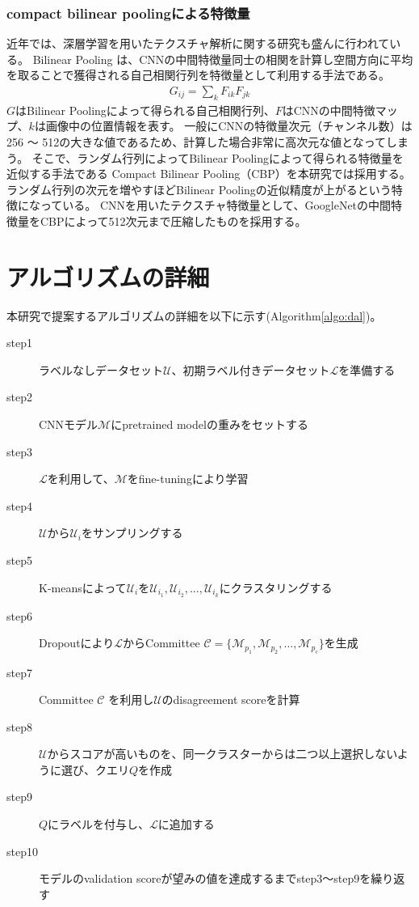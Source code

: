 \subsubsection{compact bilinear poolingによる特徴量}
近年では、深層学習を用いたテクスチャ解析に関する研究も盛んに行われている。
Bilinear Pooling \cite{lin2015bilinear}は、CNNの中間特徴量同士の相関を計算し空間方向に平均を取ることで獲得される自己相関行列を特徴量として利用する手法である。
\begin{eqnarray}
G_{ij} = \sum_k{F_{ik} F_{jk}}
\end{eqnarray}
$G$はBilinear Poolingによって得られる自己相関行列、$F$はCNNの中間特徴マップ、$k$は画像中の位置情報を表す。
一般にCNNの特徴量次元（チャンネル数）は256 〜 512の大きな値であるため、計算した場合非常に高次元な値となってしまう。
そこで、ランダム行列によってBilinear Poolingによって得られる特徴量を近似する手法である
Compact Bilinear Pooling（CBP）\cite{gao2016compact}を本研究では採用する。
ランダム行列の次元を増やすほどBilinear Poolingの近似精度が上がるという特徴になっている。
CNNを用いたテクスチャ特徴量として、GoogleNet\cite{szegedy2015going}の中間特徴量をCBPによって512次元まで圧縮したものを採用する。

\section{アルゴリズムの詳細}

本研究で提案するアルゴリズムの詳細を以下に示す(Algorithm\ref{algo:dal})。

\begin{description}
    \item[step1] ラベルなしデータセット$\mathcal{U}$、初期ラベル付きデータセット$\mathcal{L}$を準備する
    \item[step2] CNNモデル$\mathcal{M}$にpretrained modelの重みをセットする
    \item[step3] $\mathcal{L}$を利用して、$\mathcal{M}$をfine-tuningにより学習
    \item[step4] $\mathcal{U}$から$\mathcal{U}_i$をサンプリングする
    \item[step5] K-meansによって$\mathcal{U}_i$を$\mathcal{U}_{i_1}, \mathcal{U}_{i_2}, \dots, \mathcal{U}_{i_k}$にクラスタリングする
    \item[step6] Dropoutにより$\mathcal{L}$からCommittee $\mathcal{C} = \{\mathcal{M}_{p_1}, \mathcal{M}_{p_2}, \dots, \mathcal{M}_{p_c} \}$を生成
    \item[step7] Committee $\mathcal{C}$ を利用し$\mathcal{U}$のdisagreement scoreを計算
    \item[step8] $\mathcal{U}$からスコアが高いものを、同一クラスターからは二つ以上選択しないように選び、クエリ$Q$を作成
    \item[step9] $Q$にラベルを付与し、$\mathcal{L}$に追加する
    \item[step10] モデルのvalidation scoreが望みの値を達成するまでstep3〜step9を繰り返す
\end{description}


